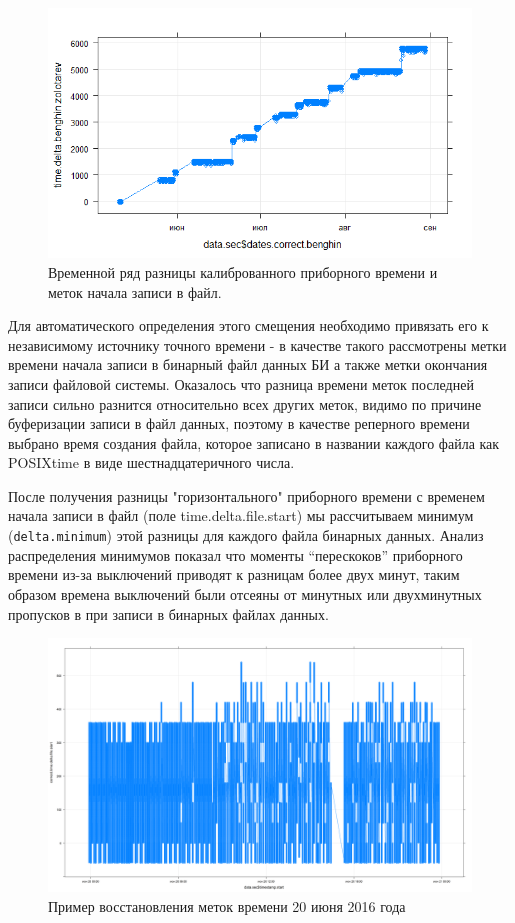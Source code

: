 \begin{figure}
	\centering
	\includegraphics[width=0.8\linewidth]{images/deprontimeplot}
	\caption[Временной ряд разницы калиброванного приборного времени и меток 
	начала записи в файл.]{Временной ряд разницы калиброванного приборного 
	времени и меток начала записи в файл.}
	\label{fig:deprontimeplot}
\end{figure}


Для автоматического определения этого смещения необходимо привязать его к 
независимому источнику точного времени - в качестве такого рассмотрены метки 
времени начала записи в бинарный файл данных БИ а также метки окончания записи 
файловой системы. Оказалось что разница времени меток последней записи сильно 
разнится относительно всех других меток, видимо по причине буферизации записи в 
файл данных, поэтому в качестве реперного времени выбрано время создания файла, 
которое записано в названии каждого файла как POSIXtime в виде 
шестнадцатеричного числа.

После получения разницы "горизонтального" приборного времени с временем начала 
записи в файл (поле time.delta.file.start) мы рассчитываем минимум 
(\texttt{delta.minimum}) этой разницы для каждого файла бинарных данных. Анализ 
распределения минимумов показал что моменты ``перескоков'' приборного времени 
из-за выключений приводят к разницам более двух минут, таким образом времена 
выключений были отсеяны от минутных или двухминутных пропусков в при записи в 
бинарных файлах данных. 





\begin{figure}
	\centering
	\includegraphics[width=0.9\linewidth]{images/depron_time_172}
	\caption{Пример восстановления меток времени 20 июня 2016 года}
	\label{fig:deprontime172}
\end{figure}






